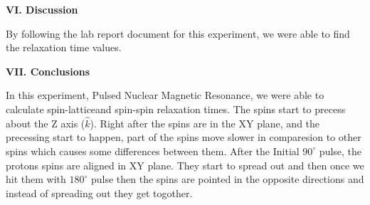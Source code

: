 \documentclass[fleqn]{article}
\begin{document}
  \pagebreak


  \textbf{VI. Discussion}

  \vspace{10px}

  By following the lab report document for this experiment, we were able to find the relaxation time values. 
  
  \vspace{20px}


  \textbf{VII. Conclusions}

  \vspace{10px}

  In this experiment, Pulsed Nuclear Magnetic Resonance, we were able to calculate spin-latticeand spin-spin relaxation times. The spins start
  to precess about the Z axis ($\hat{k}$). Right after the spins are in the XY plane, and the precessing start to happen, part of the spins move 
  slower in comparesion to other spins which causes some differences between them. 
  After the Initial $90^{\circ}$ pulse, the protons spins are aligned in XY plane. They start to spread out and then once we hit them with $180^{\circ}$ 
  pulse then the spins are pointed in the opposite directions and instead of spreading out they get togother. 

  
  \vspace{20px}


  \printbibliography
\end{document}
